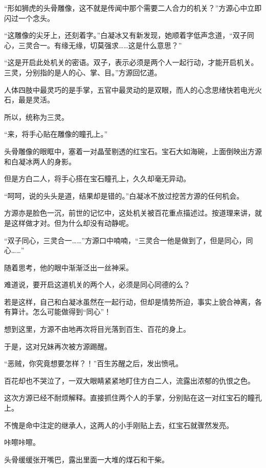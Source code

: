 
\begin{this_body}



“形如狮虎的头骨雕像，这不就是传闻中那个需要二人合力的机关？”方源心中立即闪过一个念头。

“这雕像的尖牙上，还刻着字。”白凝冰又有新发现，她顺着字低声念道，“双子同心，三灵合一。有缘无缘，切莫强求……这是什么意思？”

“这是开启此处机关的密语。双子，表示必须是两个人一起行动，才能开启机关。三灵，分别指的是人的心、掌、目。”方源回忆道。

人体四肢中最灵巧的是手掌，五官中最灵动的是双眼，而人的心念思绪快若电光火石，最是灵活。

所以，统称为三灵。

“来，将手心贴在雕像的瞳孔上。”

头骨雕像的眼眶中，塞着一对晶莹剔透的红宝石。宝石大如海碗，上面倒映出方源和白凝冰两人的身影。

但是方白二人，将手心搭在宝石瞳孔上，久久却毫无异动。

“呵呵，说的头头是道，结果却是错的。”白凝冰不放过挖苦方源的任何机会。

方源亦是脸色一沉，前世的记忆中，这处机关被百花重点描述过。按道理来讲，就是这样做才对。但为什么却没有动静呢。

“双子同心，三灵合一……”方源口中喃喃，“三灵合一他是做到了，但是同心，同心……”

随着思考，他的眼中渐渐泛出一丝神采。

难道说，要开启这道机关的两个人，必须是同心同德的么？

若是这样，自己和白凝冰虽然在一起行动，但却是情势所迫，事实上貌合神离，各有算计。怎么可能做得到“同心”！

想到这里，方源不由地再次将目光落到百生、百花的身上。

于是，这对兄妹再次被方源踢醒。

“恶贼，你究竟想要怎样？！”百生苏醒之后，发出愤吼。

百花却也不哭泣了，一双大眼睛紧紧地盯住方白二人，流露出浓郁的仇恨之色。

这次方源已经不耐烦解释。直接抓住两个人的手掌，分别贴在这一对红宝石的瞳孔上。

不愧是命中注定的继承人，这两人的小手刚贴上去，红宝石就骤然发亮。

咔嚓咔嚓。

头骨缓缓张开嘴巴，露出里面一大堆的煤石和干柴。


\end{this_body}
